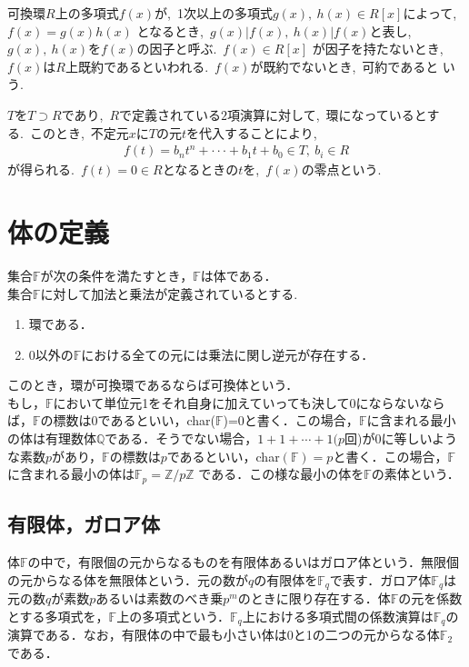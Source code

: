 可換環$R$上の多項式$f(x)$が,\ 1次以上の多項式$g(x),\ h(x) \in R[x]$によって,\ $f(x)=g(x)h(x)$
となるとき,\ $g(x)|f(x),\ h(x)|f(x)$と表し,\ $g(x),\ h(x)をf(x)の因子と呼ぶ$.\ $f(x) \in R[x]$
が因子を持たないとき,\ $f(x)はR$上既約であるといわれる.\ $f(x)$が既約でないとき,\ 可約であると
いう.\ 


$TをT \supset R$であり,\ $Rで定義されている2項演算$に対して,\ 環になっているとする.\ このとき,\ 
不定元$xにTの元t$を代入することにより,\ 
\begin{eqnarray}
f(t)=b_nt^n+ \cdot\cdot\cdot +b_1t+b_0 \in T,\ b_i \in R
\end{eqnarray}
が得られる.\ $f(t)=0 \in R$となるときの$t$を,\ $f(x)$の零点という.

\newpage
\section{体の定義}
集合$\mathbb {F}$が次の条件を満たすとき，$\mathbb {F}$は体である．\\
集合$\mathbb {F}$に対して加法と乗法が定義されているとする.
\begin{enumerate}
\item 環である．
\item 0以外の$\mathbb {F}$における全ての元には乗法に関し逆元が存在する．
\end{enumerate}
このとき，環が可換環であるならば可換体という．\\
もし，$\mathbb {F}$において単位元1をそれ自身に加えていっても決して0にならないならば，$\mathbb {F}$の標数は0であるといい，char($\mathbb {F}$)=0と書く．この場合，$\mathbb {F}$に含まれる最小の体は有理数体$\mathbb {Q}$である．そうでない場合，$1+1+\cdots +1(p$回)が0に等しいような素数$p$があり，$\mathbb {F}$の標数は$p$であるといい，char$(\mathbb {F})=p$と書く．この場合，$\mathbb {F}$に含まれる最小の体は$\mathbb {F}_p=\mathbb {Z}/p\mathbb {Z}$ である．この様な最小の体を$\mathbb {F}$の素体という．\\

\par
\subsection{有限体，ガロア体}
\par

体$\mathbb {F}$の中で，有限個の元からなるものを有限体あるいはガロア体という．無限個の元からなる体を無限体という．元の数が$q$の有限体を$\mathbb {F}_q$で表す．ガロア体$\mathbb {F}_q$は元の数$q$が素数$p$あるいは素数のべき乗$p^m$のときに限り存在する．体$\mathbb {F}$の元を係数とする多項式を，$\mathbb {F}$上の多項式という．$\mathbb {F}_q$上における多項式間の係数演算は$\mathbb {F}_q$の演算である．なお，有限体の中で最も小さい体は0と1の二つの元からなる体$\mathbb {F}_2$である．\\

